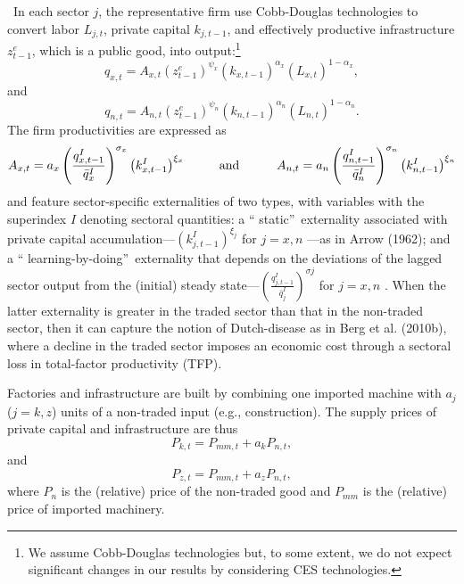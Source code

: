 \documentclass[11pt]{article}
\begin{document}
\quad\ \thinspace In each sector $j$, the representative firm use
Cobb-Douglas technologies to convert labor $L_{j,t}$, private capital $%
k_{j,t-1}$, and effectively productive infrastructure $z_{t-1}^{e}$, which
is a public good, into output:\footnote{%
We assume Cobb-Douglas technologies but, to some extent, we do not expect
significant changes in our results by considering CES technologies.} 
\begin{equation}
q_{x,t}=A_{x,t}\left( z_{t-1}^{e}\right) ^{\psi _{x}}\left( k_{x,t-1}\right)
^{\alpha _{x}}\left( L_{x,t}\right) ^{1-\alpha _{x}},  \label{qx}
\end{equation}%
and%
\begin{equation}
q_{n,t}=A_{n,t}\left( z_{t-1}^{e}\right) ^{\psi _{n}}\left( k_{n,t-1}\right)
^{\alpha _{n}}\left( L_{n,t}\right) ^{1-\alpha _{n}}.  \label{qn}
\end{equation}%
The firm productivities are expressed as 
\begin{equation*}
A_{x,t}=a_{x}\left( \frac{q_{x,t-1}^{I}}{\bar{q}_{x}^{I}}\right) ^{\sigma
_{x}}\left( k_{x,t-1}^{I}\right) ^{\xi _{x}}\text{ \ \ \ \ \ \ \ and \ \ \ \
\ \ \ \ }A_{n,t}=a_{n}\left( \frac{q_{n,t-1}^{I}}{\bar{q}_{n}^{I}}\right)
^{\sigma _{n}}\left( k_{n,t-1}^{I}\right) ^{\xi _{n}}
\end{equation*}%
and feature sector-specific externalities of two types, with variables with
the superindex $I$ denoting sectoral quantities: a \textquotedblleft
static\textquotedblright\ externality associated with private capital
accumulation---$\left( k_{j,t-1}^{I}\right) ^{\xi _{j}}$ for $j=x,n$ ---as
in Arrow (1962); and a \textquotedblleft
learning-by-doing\textquotedblright\ externality that depends on the
deviations of the lagged sector output from the (initial) steady state---$%
\left( \frac{q_{j,t-1}^{I}}{\bar{q}_{j}^{I}}\right) ^{\sigma j}$ for $j=x,n$%
. When the latter externality is greater in the traded sector than that in
the non-traded sector, then it can capture the notion of Dutch-disease as in
Berg et al. (2010b), where a decline in the traded sector imposes an
economic cost through a sectoral loss in total-factor productivity (TFP).

Factories and infrastructure are built by combining one imported machine
with $a_{j}$ ($j=k,z$) units of a non-traded input (e.g., construction). The
supply prices of private capital and infrastructure are thus 
\begin{equation}
P_{k,t}=P_{mm,t}+a_{k}P_{n,t},  \label{Pk}
\end{equation}%
and%
\begin{equation}
P_{z,t}=P_{mm,t}+a_{z}P_{n,t},  \label{Pz}
\end{equation}%
where $P_{n}$ is the (relative) price of the non-traded good and $P_{mm}$ is
the (relative) price of imported machinery.
\end{document}
